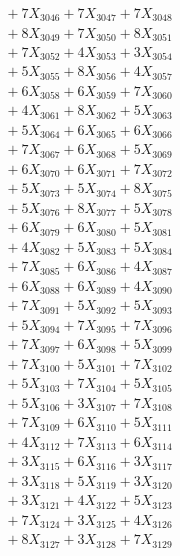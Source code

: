 \documentclass[a4paper,10pt]{article}
\begin{document}
{\begin{align}
&\;  + 7 X_{3046} + 7 X_{3047} + 7 X_{3048} \\[0.3ex]
&\;  + 8 X_{3049} + 7 X_{3050} + 8 X_{3051} \\[0.3ex]
&\;  + 7 X_{3052} + 4 X_{3053} + 3 X_{3054} \\[0.3ex]
&\;  + 5 X_{3055} + 8 X_{3056} + 4 X_{3057} \\[0.3ex]
&\;  + 6 X_{3058} + 6 X_{3059} + 7 X_{3060} \\[0.3ex]
&\;  + 4 X_{3061} + 8 X_{3062} + 5 X_{3063} \\[0.3ex]
&\;  + 5 X_{3064} + 6 X_{3065} + 6 X_{3066} \\[0.3ex]
&\;  + 7 X_{3067} + 6 X_{3068} + 5 X_{3069} \\[0.5ex]\allowbreak
&\;  + 6 X_{3070} + 6 X_{3071} + 7 X_{3072} \\[0.3ex]
&\;  + 5 X_{3073} + 5 X_{3074} + 8 X_{3075} \\[0.3ex]
&\;  + 5 X_{3076} + 8 X_{3077} + 5 X_{3078} \\[0.3ex]
&\;  + 6 X_{3079} + 6 X_{3080} + 5 X_{3081} \\[0.3ex]
&\;  + 4 X_{3082} + 5 X_{3083} + 5 X_{3084} \\[0.3ex]
&\;  + 7 X_{3085} + 6 X_{3086} + 4 X_{3087} \\[0.3ex]
&\;  + 6 X_{3088} + 6 X_{3089} + 4 X_{3090} \\[0.3ex]
&\;  + 7 X_{3091} + 5 X_{3092} + 5 X_{3093} \\[0.3ex]
&\;  + 5 X_{3094} + 7 X_{3095} + 7 X_{3096} \\[0.3ex]
&\;  + 7 X_{3097} + 6 X_{3098} + 5 X_{3099} \\[0.5ex]\allowbreak
&\;  + 7 X_{3100} + 5 X_{3101} + 7 X_{3102} \\[0.3ex]
&\;  + 5 X_{3103} + 7 X_{3104} + 5 X_{3105} \\[0.3ex]
&\;  + 5 X_{3106} + 3 X_{3107} + 7 X_{3108} \\[0.3ex]
&\;  + 7 X_{3109} + 6 X_{3110} + 5 X_{3111} \\[0.3ex]
&\;  + 4 X_{3112} + 7 X_{3113} + 6 X_{3114} \\[0.3ex]
&\;  + 3 X_{3115} + 6 X_{3116} + 3 X_{3117} \\[0.3ex]
&\;  + 3 X_{3118} + 5 X_{3119} + 3 X_{3120} \\[0.3ex]
&\;  + 3 X_{3121} + 4 X_{3122} + 5 X_{3123} \\[0.3ex]
&\;  + 7 X_{3124} + 3 X_{3125} + 4 X_{3126} \\[0.3ex]
&\;  + 8 X_{3127} + 3 X_{3128} + 7 X_{3129} \\[0.5ex]\allowbreak

\end{align}}
\end{document}
